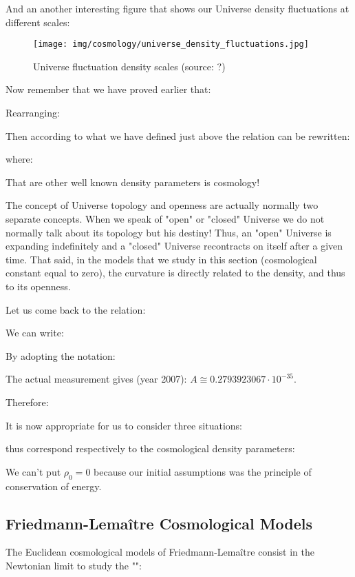 	And an another interesting figure that shows our Universe density fluctuations at different scales:
	\begin{figure}[H]
		\centering
		\texttt{[image: img/cosmology/universe\_density\_fluctuations.jpg]}	
		\caption[Universe fluctuation density scales]{Universe fluctuation density scales (source: ?)}
	\end{figure}
	Now remember that we have proved earlier that:
	
	Rearranging:
	
	Then according to what we have defined just above the relation can be rewritten:
	
	where:
	
	That are other well known density parameters is cosmology!
	
	\begin{tcolorbox}[title=Remark,colframe=black,arc=10pt]
	The concept of Universe topology and openness are actually normally two separate concepts. When we speak of "open" or "closed" Universe we do not normally talk about its topology but his destiny! Thus, an "open" Universe is expanding indefinitely and a "closed" Universe recontracts on itself after a given time. That said, in the models that we study in this section (cosmological constant equal to zero), the curvature is directly related to the density, and thus to its openness.
	\end{tcolorbox}
	Let us come back to the relation:
	
	We can write:
	
	By adopting the notation:
	
	\begin{tcolorbox}[title=Remark,colframe=black,arc=10pt]
	The actual measurement gives (year 2007): $A\cong 0.2793923067\cdot 10^{-35}$.
	\end{tcolorbox}
	Therefore:
	
	It is now appropriate for us to consider three situations:
	
	thus correspond respectively to the cosmological density parameters:
	
	\begin{tcolorbox}[title=Remark,colframe=black,arc=10pt]
	We can't put $\rho_0=0$ because our initial assumptions was the principle of conservation of energy.
	\end{tcolorbox}
	
	\pagebreak	
	\subsection{Friedmann-Lemaître Cosmological Models}\label{Friedmann-Lemaitre Cosmological Models}
	The Euclidean cosmological models of Friedmann-Lemaître consist in the Newtonian  limit to study the  "":
	
